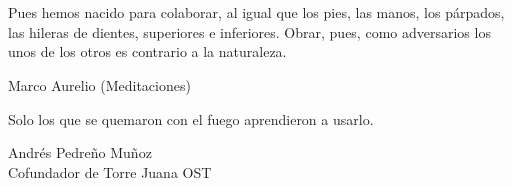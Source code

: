 \cleardoublepage %
\chapter*{}
\epigraph{
Pues hemos nacido para colaborar,
al igual que los pies, las manos,
los párpados, las hileras de dientes,
superiores e inferiores. 
Obrar, pues, como adversarios los unos de los otros
es contrario a la naturaleza.
}
{Marco Aurelio (Meditaciones)}
\vspace{4cm}
\epigraph{
    Solo los que se quemaron con el fuego aprendieron a usarlo.
}
{Andrés Pedreño Muñoz\\Cofundador de Torre Juana OST}

\cleardoublepage %

\tableofcontents
\listoffigures
\listoftables
\lstlistoflistings
